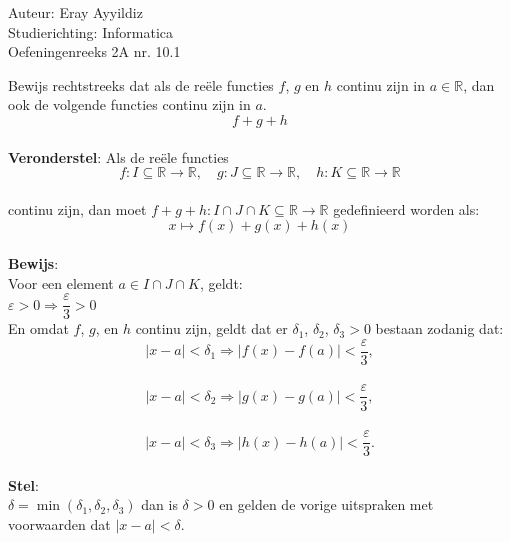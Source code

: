 \documentclass[a4paper]{article}
\begin{document}
  
\noindent \large Auteur: Eray Ayyildiz \\ 
\noindent \large Studierichting: Informatica \\ 
\noindent \large Oefeningenreeks 2A nr. 10.1 \\

\medskip

\normalsize
Bewijs rechtstreeks dat als de reële functies $f$, $g$ en $h$ continu zijn in $a \in \mathbb{R}$, dan ook de volgende functies continu zijn in $a$.\\

$$ f+g+h $$\\

\textbf{Veronderstel}:  
Als de reële functies  
$$ f: I \subseteq \mathbb{R} \to \mathbb{R}, \quad  
g: J \subseteq \mathbb{R} \to \mathbb{R}, \quad  
h: K \subseteq \mathbb{R} \to \mathbb{R} $$\\ 
 
continu zijn, dan moet $f+g+h: I \cap J \cap K \subseteq \mathbb{R} \to \mathbb{R}$ gedefinieerd worden als:\\  

$$ x \mapsto f(x) + g(x) + h(x) $$\\  

\textbf{Bewijs}: \\  

Voor een element $a \in I \cap J \cap K$, geldt:\\
  
$ \varepsilon > 0 \Rightarrow \dfrac{\varepsilon}{3} > 0 $\\  

En omdat $f$, $g$, en $h$ continu zijn, geldt dat er $\delta_1$, $\delta_2$, $\delta_3 > 0$ bestaan zodanig dat:\\  

$$ |x - a| < \delta_1 \Rightarrow |f(x) - f(a)| < \dfrac{\varepsilon}{3}, $$\\  

$$ |x - a| < \delta_2 \Rightarrow |g(x) - g(a)| < \dfrac{\varepsilon}{3}, $$\\ 
 
$$ |x - a| < \delta_3 \Rightarrow |h(x) - h(a)| < \dfrac{\varepsilon}{3}. $$\\  

\textbf{Stel}:\\  

$ \delta = \min(\delta_1, \delta_2, \delta_3) $ dan is $\delta > 0$ en gelden de vorige uitspraken met voorwaarden dat $|x - a| < \delta$.\\  
\end{document}
